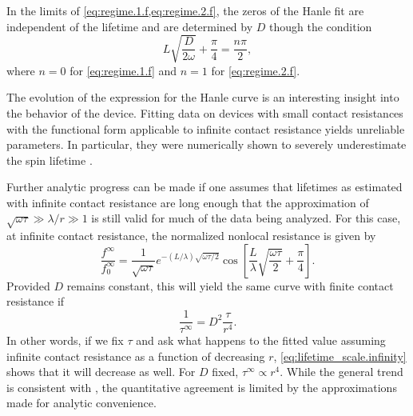 In the limits of \cref{eq:regime.1.f,eq:regime.2.f},
the zeros of the Hanle fit are independent of the lifetime
and are determined by $D$ though the condition
\begin{equation}
  L \sqrt{\frac{D}{2 ω}} + \frac{π}{4} = \frac{n π}{2} ,
\end{equation}
where $n = 0$ for \cref{eq:regime.1.f} and $n = 1$ for \cref{eq:regime.2.f}.

The evolution of the expression for the Hanle curve
is an interesting insight into the behavior of the device.
Fitting data on devices with small contact resistances
with the functional form applicable to infinite contact resistance
yields unreliable parameters.
In particular, they were numerically shown to severely underestimate the spin lifetime
\cite{PhysRevB.86.235408}.

Further analytic progress can be made if one assumes that
lifetimes as estimated with infinite contact resistance are long
enough that the approximation of $\sqrt{ω τ} ≫ λ / r ≫ 1$
is still valid for much of the data being analyzed.
For this case, at infinite contact resistance,
the normalized nonlocal resistance is given by
\begin{equation}
  \frac{f^∞}{f^∞_0} = \frac{1}{ \sqrt{ω τ}}
                      e^{- \left( L / λ \right) \sqrt{ω τ / 2}}
                      \cos{\left[ \frac{L}{λ} \sqrt{\frac{ω τ}{2}} + \frac{π}{4} \right]} .
\end{equation}
Provided $D$ remains constant,
this will yield the same curve with finite contact resistance if
\begin{equation}
  \label{eq:lifetime_scale.infinity}
  \frac{1}{τ^∞} = D^2 \frac{τ}{r^4} .
\end{equation}
In other words, if we fix $τ$ and ask what happens to the fitted value
assuming infinite contact resistance as a function of decreasing $r$,
\cref{eq:lifetime_scale.infinity} shows that it will decrease as well.
For $D$ fixed, $τ^∞ ∝ r^4$.
While the general trend is consistent with
\cite{PhysRevB.86.235408},
the quantitative agreement is limited by
the approximations made for analytic convenience.
